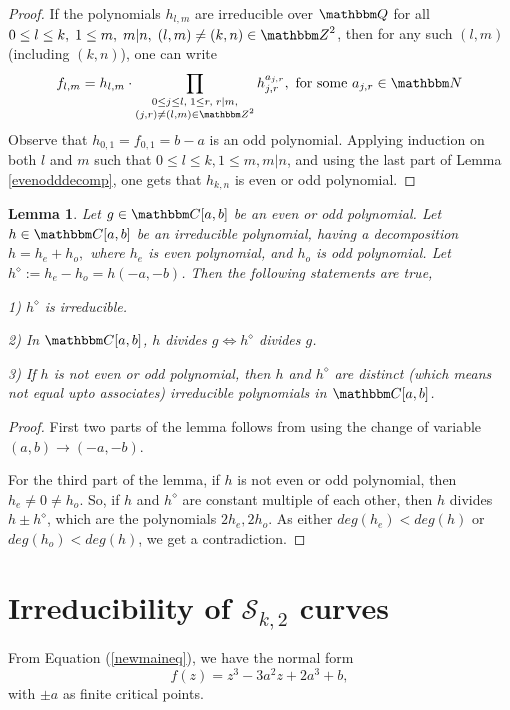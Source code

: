 \documentclass[reqno]{amsart}
\renewcommand{\eqref}[1]{(\ref{#1})}
\numberwithin{equation}{section}
\theoremstyle{plain}
\newtheorem{lemma}[theorem]{Lemma}
\theoremstyle{definition}
\theoremstyle{definition}
\newcommand{\Q}{{\mathbbm Q}}
\newcommand{\Z}{{\mathbbm Z}}
\newcommand{\C}{{\mathbbm C}}
\newcommand{\N}{{\mathbbm N}}
\begin{document}
    \begin{proof}
        If the polynomials $h_{l,m}$ are irreducible over $\Q$ for all $0\leq l\leq k,\; 1\leq m,\; m|n,\; (l,m)\neq (k,n) \in \Z^{2}$, then for any such $(l,m)$ (including $(k,n)$), one can write
        \begin{equation*}
            f_{l,m}= h_{l,m} \cdot \prod_{\substack{0\leq j\leq l,\; 1\leq r,\; r|m,\\ (j,r)\neq (l,m) \in \Z^{2}}} h_{j,r}^{a_{j,r}}, \text{ for some } a_{j,r}\in \N
        \end{equation*}
        Observe that $h_{0,1}=f_{0,1}=b-a$ is an odd polynomial. Applying induction on both $l$ and $m$ such that $0\leq l\leq k, 1\leq m, m|n$, and using the last part of Lemma \ref{evenodddecomp}, one gets that $h_{k,n}$ is even or odd polynomial.
    \end{proof}
    \begin{lemma}\label{t}
        Let $g\in \C[a,b]$ be an even or odd polynomial. Let $h\in \C[a,b]$ be an irreducible polynomial, having a decomposition $h=h_{e}+h_{o},$ where $h_{e}$ is even polynomial, and $h_{o}$ is odd polynomial. Let $h^{\diamond}:= h_{e}-h_{o}= h(-a,-b)$. Then the following statements are true,

            1) $h^{\diamond}$ is irreducible.

            2) In $\C[a,b]$, $h$ divides $g \iff h^{\diamond}$ divides $g$.

            3) If $h$ is not even or odd polynomial, then $h$ and $h^{\diamond}$ are distinct (which means not equal upto associates) irreducible polynomials in $\C[a,b]$.
    \end{lemma}
    \begin{proof}
        First two parts of the lemma follows from using the change of variable $(a,b) \rightarrow (-a,-b)$.

        For the third part of the lemma, if $h$ is not even or odd polynomial, then $h_{e}\neq 0 \neq h_{o}$. So, if $h$ and $h^{\diamond}$ are constant multiple of each other, then $h$ divides $h\pm h^{\diamond}$, which are the polynomials $2h_{e},2h_{o}$. As either $deg(h_{e})<deg(h)$ or $deg(h_{o})<deg (h)$, we get a contradiction.
    \end{proof}

\section{Irreducibility of $\mathscr{S}_{k,2}$ curves}\label{t''}
    From Equation \eqref{newmaineq}, we have the normal form
    \begin{equation}\label{maineqcopy}
        f(z) = z^{3} - 3a^{2}z + 2a^{3} + b, 
    \end{equation}
    with $\pm a$ as finite critical points.
\end{document}
